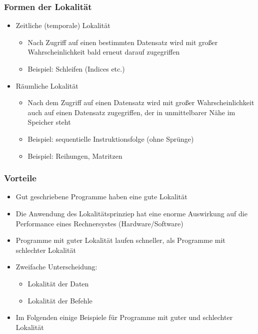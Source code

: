 		\subsubsection{Formen der Lokalität}
			\begin{itemize}
				\item Zeitliche (temporale) Lokalität
					\begin{itemize}
						\item Nach Zugriff auf einen bestimmten Datensatz wird mit gro\ss er Wahrscheinlichkeit
							bald erneut darauf zugegriffen
						\item Beispiel: Schleifen (Indices etc.)
					\end{itemize}
				\item Räumliche Lokalität
					\begin{itemize}
						\item Nach dem Zugriff auf einen Datensatz wird mit gro\ss er Wahrscheinlichkeit auch auf 
							einen Datensatz zugegriffen, der in unmittelbarer Nähe im Speicher steht
						\item Beispiel: sequentielle Instruktionsfolge (ohne Sprünge)
						\item Beispiel: Reihungen, Matritzen
					\end{itemize}
			\end{itemize}

		\subsubsection{Vorteile}
			\begin{itemize}
				\item Gut geschriebene Programme haben eine gute Lokalität
				\item Die Anwendung des Lokalitätsprinziep hat eine enorme Auswirkung auf die Performance eines Rechnersystes (Hardware/Software)
				\item Programme mit guter Lokalität laufen schneller, als Programme mit schlechter Lokalität
				\item Zweifache Unterscheidung:
					\begin{itemize}
						\item Lokalität der Daten
						\item Lokalität der Befehle
					\end{itemize}
				\item Im Folgenden einige Beispiele für Programme mit guter und schlechter Lokalität
			\end{itemize}


